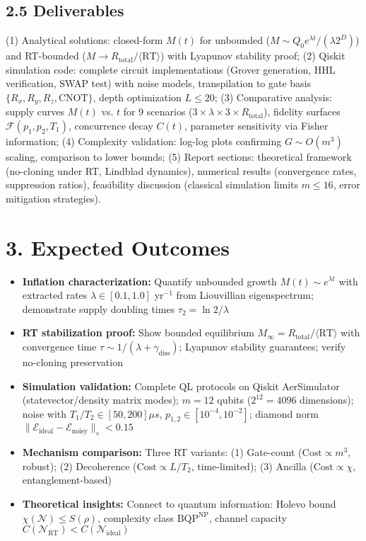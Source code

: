 \documentclass[a4paper,11pt,twoside]{article}
\begin{document}
\vspace{-4pt}
\subsection*{2.5 Deliverables}
\vspace{-4pt}

(1) Analytical solutions: closed-form $M(t)$ for unbounded ($M \sim Q_0 e^{\lambda t}/(\lambda 2^D)$) and RT-bounded ($M \to R_{\text{total}}/\langle\text{RT}\rangle$) with Lyapunov stability proof; (2) Qiskit simulation code: complete circuit implementations (Grover generation, HHL verification, SWAP test) with noise models, transpilation to gate basis $\{R_x, R_y, R_z, \text{CNOT}\}$, depth optimization $L \leq 20$; (3) Comparative analysis: supply curves $M(t)$ vs. $t$ for 9 scenarios ($3\times\lambda \times 3\times R_{\text{total}}$), fidelity surfaces $\mathcal{F}(p_1, p_2, T_1)$, concurrence decay $C(t)$, parameter sensitivity via Fisher information; (4) Complexity validation: log-log plots confirming $G \sim O(m^3)$ scaling, comparison to lower bounds; (5) Report sections: theoretical framework (no-cloning under RT, Lindblad dynamics), numerical results (convergence rates, suppression ratios), feasibility discussion (classical simulation limits $m \leq 16$, error mitigation strategies).

\vspace{-4pt}
\section*{3. Expected Outcomes}
\vspace{-4pt}

\begin{itemize}
    \item \textbf{Inflation characterization:} Quantify unbounded growth $M(t) \sim e^{\lambda t}$ with extracted rates $\lambda \in [0.1, 1.0]$ yr$^{-1}$ from Liouvillian eigenspectrum; demonstrate supply doubling times $\tau_2 = \ln 2/\lambda$
    \item \textbf{RT stabilization proof:} Show bounded equilibrium $M_{\infty} = R_{\text{total}}/\langle\text{RT}\rangle$ with convergence time $\tau \sim 1/(\lambda + \gamma_{\text{diss}})$; Lyapunov stability guarantees; verify no-cloning preservation
    \item \textbf{Simulation validation:} Complete QL protocols on Qiskit AerSimulator (statevector/density matrix modes); $m=12$ qubits ($2^{12}=4096$ dimensions); noise with $T_1/T_2 \in [50, 200]\mu s$, $p_{1,2} \in [10^{-4}, 10^{-2}]$; diamond norm $\|\mathcal{E}_{\text{ideal}} - \mathcal{E}_{\text{noisy}}\|_\diamond < 0.15$
    \item \textbf{Mechanism comparison:} Three RT variants: (1) Gate-count ($\text{Cost} \propto m^3$, robust); (2) Decoherence ($\text{Cost} \propto L/T_2$, time-limited); (3) Ancilla ($\text{Cost} \propto \chi$, entanglement-based)
    \item \textbf{Theoretical insights:} Connect to quantum information: Holevo bound $\chi(\mathcal{N}) \leq S(\rho)$, complexity class $\text{BQP}^{\text{NP}}$, channel capacity $C(\mathcal{N}_{\text{RT}}) < C(\mathcal{N}_{\text{ideal}})$
\end{itemize}
\end{document}

